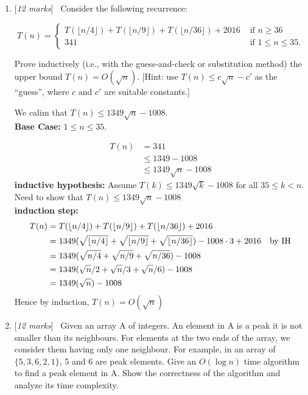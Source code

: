 \documentclass[11pt]{article}
\newcommand{\Q}[1]{\medskip\item {[{\em #1 marks\/}]}\ }
\begin{document}
\begin{enumerate}

\Q{12} Consider the following recurrence:

$$T(n) = \left\{\begin{array}{ll}
T(\lfloor n/4 \rfloor) + T(\lfloor n/9 \rfloor) + T(\lfloor n/36 \rfloor) + 2016 & \text{ if }  n \geq 36\\
341 & \text{ if }1 \le n \le 35.
\end{array}\right.$$

Prove inductively (i.e., with the guess-and-check or substitution method) the upper bound $T(n) = O(\sqrt{n})$.
[Hint: use $T(n) \le c\sqrt{n} - c'$ as the ``guess'', where $c$ and $c'$ are suitable constants.]

We calim that $T(n) \leq 1349 \sqrt{n} - 1008$.\\
\textbf{Base Case:} $1 \leq n \leq 35$. 

\begin{align*}
    T(n) & = 341 \\
    & \leq 1349 - 1008 \\
    & \leq 1349 \sqrt{n} - 1008
\end{align*}
\textbf{inductive hypothesis:} Assume $T(k) \leq 1349 \sqrt{k} - 1008$ for all $35 \leq k < n$. Need to show that 
$T(n) \leq 1349 \sqrt{n} -1008$\\
\textbf{induction step:} 
\begin{align*}
    T(n) & = T(\lfloor n/4 \rfloor) + T(\lfloor n/9 \rfloor) + T(\lfloor n/36 \rfloor) + 2016 \\
    & = 1349 (\sqrt{\lfloor n/4 \rfloor} + \sqrt{\lfloor n/9 \rfloor} + \sqrt{\lfloor n/36 \rfloor}) 
    - 1008 \cdot 3 + 2016 \text{\quad by IH}\\
    & = 1349 (\sqrt{n/4} + \sqrt{n/9} + \sqrt{n/36}) - 1008 \\
    & = 1349 (\sqrt{n} / 2 + \sqrt{n} / 3 + \sqrt{n} / 6) - 1008 \\
    & = 1349 (\sqrt{n}) - 1008
\end{align*}
Hence by induction, $T(n) = O(\sqrt{n})$

\newpage
\Q{12} Given an array A of integers. An element in A is a peak it is not smaller than its neighbours.
For elements at the two ends of the array, we consider them having only one neighbour.
For example, in an array of $\{5,3,6,2,1\}$, 5 and 6 are peak elements. 
Give an $O(\log n)$ time algorithm to find a peak element in A.
Show the correctness of the algorithm and analyze its time complexity.


\end{enumerate}
\end{document}
